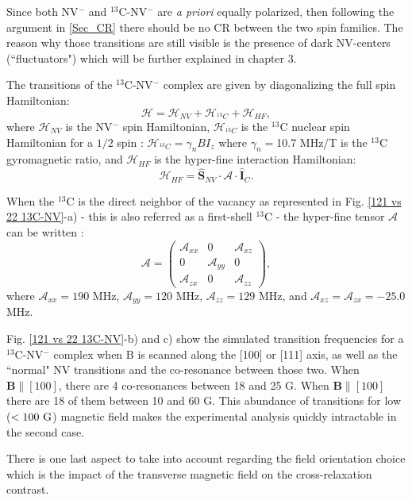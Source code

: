 \documentclass[a4paper,11pt]{report}
\begin{document}
Since both NV$^-$ and $^{13}$C-NV$^-$ are \textit{a priori} equally polarized, then following the argument in \ref{Sec_CR} there should be no CR between the two spin families. The reason why those transitions are still visible is the presence of dark NV-centers (``fluctuators") which will be further explained in chapter 3.

The transitions of the $^{13}$C-NV$^-$ complex are given by diagonalizing the full spin Hamiltonian:
\begin{equation*}
\mathcal{H}=\mathcal{H}_{NV}+\mathcal{H}_{^{13}C}+\mathcal{H}_{HF},
\end{equation*}
where $\mathcal{H}_{NV}$ is the NV$^-$ spin Hamiltonian,
$\mathcal{H}_{^{13}C}$ is the $^{13}$C nuclear spin Hamiltonian for a $1/2$ spin : $\mathcal{H}_{^{13}C}=\gamma_{n} B I_z$ where $\gamma_{n}=$10.7 MHz/T is the $^{13}$C gyromagnetic ratio, and $\mathcal{H}_{HF}$ is the hyper-fine interaction Hamiltonian: $$\mathcal{H}_{HF}= \hat{\mathbf{S}}_{NV} \cdot \mathcal{A} \cdot \hat{\mathbf{I}}_C.$$

When the $^{13}$C is the direct neighbor of the vacancy as represented in Fig. \ref{121 vs 22 13C-NV}-a) - this is also referred as a first-shell $^{13}$C - the hyper-fine tensor $\mathcal{A}$ can be written \citep{simanovskaia2013sidebands}:
$$ \mathcal{A} = \begin{pmatrix}
\mathcal{A}_{xx} & 0 & \mathcal{A}_{xz} \\ 0 & \mathcal{A}_{yy} & 0 \\ \mathcal{A}_{zx} & 0 & \mathcal{A}_{zz}
\end{pmatrix},$$
where $\mathcal{A}_{xx}=190$ MHz, $\mathcal{A}_{yy}=120$ MHz, $\mathcal{A}_{zz}=129$ MHz, and  $\mathcal{A}_{xz}=\mathcal{A}_{zx}=-25.0$ MHz. 

Fig. \ref{121 vs 22 13C-NV}-b) and c) show the simulated transition frequencies for a $^{13}$C-NV$^-$ complex when B is scanned along the [100] or [111] axis, as well as the ``normal" NV transitions and the co-resonance between those two. When $\mathbf{B} \parallel [100]$, there are 4 co-resonances between 18 and 25 G. When $\mathbf{B} \parallel [100]$ there are 18 of them between 10 and 60 G. This abundance of transitions for low ($<100\ \rm G$) magnetic field makes the experimental analysis quickly intractable in the second case.

There is one last aspect to take into account regarding the field orientation choice which is the impact of the transverse magnetic field on the cross-relaxation contrast.
\end{document}
